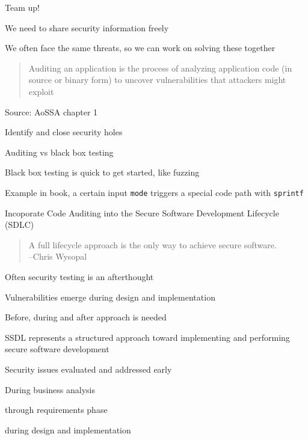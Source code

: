 \documentclass[Screen16to9,17pt]{foils}
\begin{document}


\begin{list1}
\item Team up!
\item We need to share security information freely
\item We often face the same threats, so we can work on solving these together
\end{list1}



\begin{quote}
Auditing an application is the process of analyzing application code (in source or binary form) to uncover vulnerabilities that attackers might exploit
\end{quote}
Source: AoSSA chapter 1

\begin{list2}
\item Identify and close security holes
\item Auditing vs black box testing
\item Black box testing is quick to get started, like fuzzing
\item Example in book, a certain input \verb+mode+ triggers a special code path with \verb+sprintf+
\item Incoporate Code Auditing into the Secure Software Development Lifecycle (SDLC)
\end{list2}


\begin{quote}
  A full lifecycle approach is the only way to achieve secure software.\\
  --Chris Wysopal
\end{quote}

\begin{list2}
\item Often security testing is an afterthought
\item Vulnerabilities emerge during design and implementation
\item Before, during and after approach is needed
\end{list2}


\begin{list2}
\item SSDL represents a structured approach toward implementing and performing secure software development
\item Security issues evaluated and addressed early
\item During business analysis
\item through requirements phase
\item during design and implementation
\end{list2}
\end{document}
